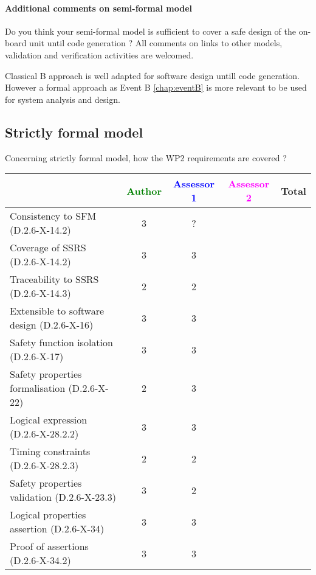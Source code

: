 \paragraph{Additional comments on semi-formal  model} Do you think your semi-formal  model is sufficient to cover a safe design of the on-board unit until code generation ?
All comments on links to  other models, validation and verification activities are welcomed.



\begin{author_comment}
Classical B  approach is well adapted for software design untill code generation. However a formal approach as Event B \ref{chap:eventB} is more relevant to be used for system analysis and design.
\end{author_comment}


\subsection{Strictly formal model}

Concerning strictly formal model, how the WP2 requirements are covered ?

\begin{tabular}{|l | c | c | c | c|}
\hline
& \textcolor{green}{Author} & \textcolor{blue}{Assessor 1} & \textcolor{magenta}{Assessor 2} & Total \\
\hline 
Consistency to SFM (D.2.6-X-14.2) & 3 & ? & &  \\
\hline
Coverage of SSRS (D.2.6-X-14.2)  & 3 & 3 & &  \\
\hline
Traceability to  SSRS (D.2.6-X-14.3)  & 2 & 2 & &  \\
\hline
Extensible to software design (D.2.6-X-16)  & 3 & 3 & &  \\
\hline
Safety function isolation (D.2.6-X-17)  & 3 & 3 & &  \\
\hline 
Safety properties formalisation (D.2.6-X-22)  & 2 & 3 & &  \\
\hline
Logical expression (D.2.6-X-28.2.2)  & 3 & 3 & &  \\
\hline
Timing constraints (D.2.6-X-28.2.3)  & 2 & 2 & &  \\
\hline
Safety properties validation (D.2.6-X-23.3)  & 3 & 2 & &  \\
\hline
Logical properties assertion (D.2.6-X-34)  & 3 & 3 & &  \\
\hline
Proof of assertions (D.2.6-X-34.2)  & 3 & 3 & &  \\
\hline
\end{tabular}




